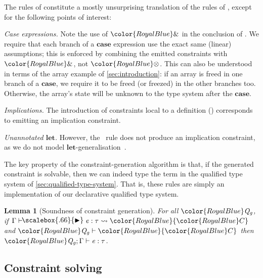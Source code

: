 \documentclass[acmsmall,usenames,dvipsnames,natbib=false,acmthm=false,screen]{acmart}
\newcommand{\constraintcolour}{\color{RoyalBlue}}
\newcommand{\constraintfont}[1]{{\constraintcolour#1}}
\newcommand{\vdashi}{%
      \mathrel{%
          \vdash\hspace*{-4pt}%
          \raisebox{0.9pt}{\scalebox{.66}{\(\blacktriangleright\)}}%
      }%
  }
\newcommand{\constraintop}[1]{\mathop{\constraintfont{#1}}}
\newcommand{\aand}{\constraintop{\&}}
\newcommand{\qtensor}{\constraintop{\otimes}}
\newcommand{\keyword}[1]{\mathbf{#1}}
\newcommand{\kcase}{\keyword{case}}
\theoremstyle{acmplain}
\newtheorem{lemma}[theorem]{Lemma}
\theoremstyle{acmdefinition}
\begin{document}
The rules of  constitute a mostly
unsurprising translation of the rules of ,
except for the following points of interest:

\emph{Case expressions.}
Note the use of $ \aand $ in the conclusion of .
We require that each branch of a $\kcase$ expression use the exact
same (linear) assumptions; this is enforced by combining the
emitted constraints with $ \aand $, not $ \qtensor $.
%
  This can also be understood in terms of the array example of
  \cref{sec:introduction}:
  if an array is freed in one branch of a $\kcase$, we require it to be freed (or freezed) in
the other branches too.
  Otherwise, the array's state will be unknown to the type system
  after the $\kcase$.
%

\emph{Implications.} The introduction of constraints local to a
  definition () corresponds to
  emitting an implication constraint.

\emph{Unannotated \ensuremath{\mathbf{let}}.}
 However, the~ rule does not produce an implication
  constraint, as we do not model \ensuremath{\mathbf{let}}-generalisation~\cite{let-should-not-be-generalised}.


\vspace{1ex}
The key property of the constraint-generation algorithm is that,
if the generated constraint is solvable, then we can indeed type the
term in the qualified type system of
\cref{sec:qualified-type-system}. That is,
these rules are simply an implementation of our declarative qualified
type system.

\begin{lemma}[Soundness of constraint generation]\label{lem:generation-soundness}
  For all $  \constraintfont{ \ottnt{Q_{\ottmv{g}}} }  $, if $\Gamma  \vdashi  \ottnt{e}  \ottsym{:}  \tau  \leadsto   \constraintfont{ \constraintfont{C} } $ and $ \constraintfont{ \ottnt{Q_{\ottmv{g}}} }   \vdash   \constraintfont{ \constraintfont{C} } $ then
  $ \constraintfont{ \ottnt{Q_{\ottmv{g}}} }   \ottsym{;}  \Gamma  \vdash  \ottnt{e}  \ottsym{:}  \tau$.
\end{lemma}

\subsection{Constraint solving}
\label{sec:constraint-solver}
\end{document}
